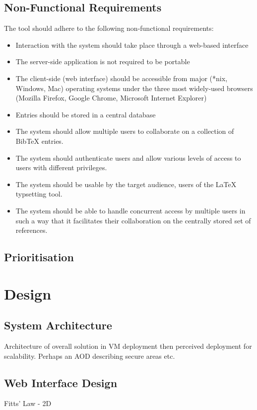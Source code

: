 \documentclass{l4proj}
\begin{document}
\section{Non-Functional Requirements}
The tool should adhere to the following non-functional requirements:
\begin{itemize}
\item Interaction with the system should take place through a web-based interface
\item The server-side application is not required to be portable
\item The client-side (web interface) should be accessible from major (*nix, Windows, Mac) operating systems under the three most widely-used browsers (Mozilla Firefox, Google Chrome, Microsoft Internet Explorer)
\item Entries should be stored in a central database
\item The system should allow multiple users to collaborate on a collection of BibTeX entries.
\item The system should authenticate users and allow various levels of access to users with different privileges.
\item The system should be usable by the target audience, users of the LaTeX typsetting tool.
\item The system should be able to handle concurrent access by multiple users in such a way that it facilitates their collaboration on the centrally stored set of references.
\end{itemize}

\section{Prioritisation}



\chapter{Design}
\label{design}

\section{System Architecture}
Architecture of overall solution in VM deployment then perceived deployment for scalability. Perhaps an AOD describing secure areas etc.

\section{Web Interface Design}
Fitts' Law - 2D
\end{document}
